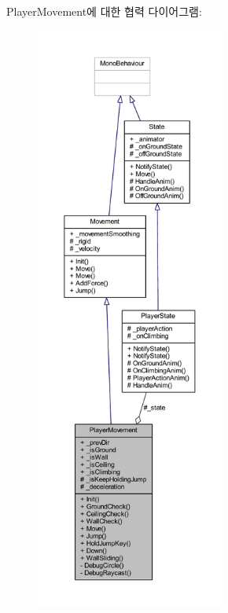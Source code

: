 Player\+Movement에 대한 협력 다이어그램\+:
\nopagebreak
\begin{figure}[H]
\begin{center}
\leavevmode
\includegraphics[height=550pt]{d5/df4/class_player_movement__coll__graph}
\end{center}
\end{figure}
